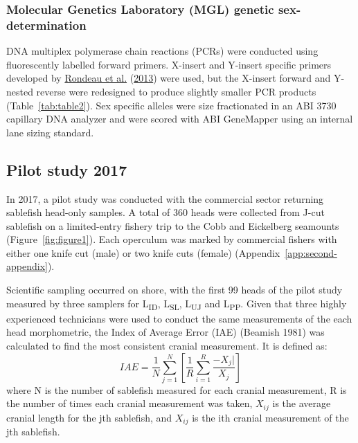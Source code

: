 \documentclass[12pt]{article}\usepackage[]{graphicx}\usepackage[]{color}
\begin{document}
\hypertarget{molecular-genetics-laboratory-mgl-genetic-sex-determination}{%
\subsubsection{Molecular Genetics Laboratory (MGL) genetic sex-determination}\label{molecular-genetics-laboratory-mgl-genetic-sex-determination}}

DNA multiplex polymerase chain reactions (PCRs) were conducted using fluorescently labelled forward primers. X-insert and Y-insert specific primers developed by \protect\hyperlink{ref-Rondeau2013}{Rondeau et al.} (\protect\hyperlink{ref-Rondeau2013}{2013}) were used, but the X-insert forward and Y-nested reverse were redesigned to produce slightly smaller PCR products (Table~\ref{tab:table2}). Sex specific alleles were size fractionated in an ABI 3730 capillary DNA analyzer and were scored with ABI GeneMapper using an internal lane sizing standard.

\hypertarget{pilot-study-2017}{%
\subsection{Pilot study 2017}\label{pilot-study-2017}}

In 2017, a pilot study was conducted with the commercial sector returning sablefish head-only samples. A total of 360 heads were collected from J-cut sablefish on a limited-entry fishery trip to the Cobb and Eickelberg seamounts (Figure~\ref{fig:figure1}). Each operculum was marked by commercial fishers with either one knife cut (male) or two knife cuts (female) (Appendix~\ref{app:second-appendix}).

Scientific sampling occurred on shore, with the first 99 heads of the pilot study measured by three samplers for L\textsubscript{ID}, L\textsubscript{SL}, L\textsubscript{UJ} and L\textsubscript{PP}. Given that three highly experienced technicians were used to conduct the same measurements of the each head morphometric, the Index of Average Error (IAE) (Beamish 1981) was calculated to find the most consistent cranial measurement. It is defined as: \[
IAE=\frac{1}{N}\sum_{j = 1}^{N}\left[\frac{1}{R}\sum_{i = 1}^{R}\frac{ - X_j|}{X_j}\right]
\] where N is the number of sablefish measured for each cranial measurement, R is the number of times each cranial measurement was taken, \(X_{ij}\) is the average cranial length for the jth sablefish, and \(X_{ij}\) is the ith cranial measurement of the jth sablefish.
\end{document}
